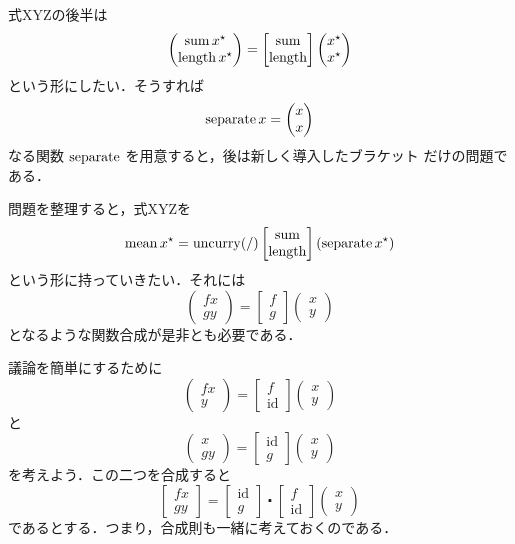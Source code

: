 \documentclass[a5paper,twoside,fleqn,draft]{jsbook}
\newcommand{\mSpecialFunc}[1]{#1}
\DeclareMathOperator{\mId}{\mSpecialFunc{id}}
\DeclareMathOperator{\mSum}{\mSpecialFunc{sum}}
\DeclareMathOperator{\mUncurry}{\mSpecialFunc{uncurry}}
\DeclareMathOperator{\mCompCat}{\centerdot}
\newcommand{\mPairWith}[2]{\begin{pmatrix}#1\\#2\end{pmatrix}}
\newcommand{\mList}[1]{{#1}^\mathrm{\star}}
\begin{document}
式XYZの後半は
\begin{equation}
  \mPairWith{\mSum\mList{x}}{\mLength\mList{x}}
  =\begin{bmatrix}
  \mSum\\
  \mLength
  \end{bmatrix}
  \mPairWith{\mList{x}}{\mList{x}}
\end{equation}
という形にしたい．そうすれば
\begin{equation}
  \mSeparate x
  =\mPairWith{x}{x}
\end{equation}
なる関数 $\mathop{\mathrm{separate}}$ を用意すると，後は新しく導入したブラケット
だけの問題である．

問題を整理すると，式XYZを
\begin{equation}
  \mMean\mList{x}
  =\mUncurry(/)\begin{bmatrix}
    \mSum\\
    \mLength
  \end{bmatrix}
  (\mSeparate\mList{x})
\end{equation}
という形に持っていきたい．それには
\begin{equation}
  \mPairWith{fx}{gy}
  =\begin{bmatrix}f
  \\
  g
  \end{bmatrix}
  \mPairWith{x}{y}
\end{equation}
となるような関数合成が是非とも必要である．

議論を簡単にするために
\begin{equation}
  \mPairWith{fx}{y}
  =\begin{bmatrix}
  f\\
  \mId
  \end{bmatrix}
  \mPairWith{x}{y}
\end{equation}
と
\begin{equation}
  \mPairWith{x}{gy}
  =\begin{bmatrix}
  \mId\\
  g
  \end{bmatrix}
  \mPairWith{x}{y}
\end{equation}
を考えよう．この二つを合成すると
\begin{equation}
  \begin{bmatrix}
    fx\\
    gy
  \end{bmatrix}
  =
  \begin{bmatrix}
    \mId\\
    g
  \end{bmatrix}
  \mCompCat
  \begin{bmatrix}
    f\\
    \mId
  \end{bmatrix}
  \mPairWith{x}{y}
\end{equation}
であるとする．つまり，合成則も一緒に考えておくのである．
\end{document}
